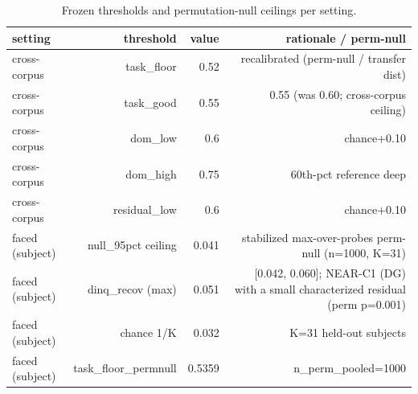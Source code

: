 \begin{table}[t]
\centering
\caption{Frozen thresholds and permutation-null ceilings per setting.}
\label{tab:thresh}
\begin{tabular}{lrrr}
\toprule
setting & threshold & value & rationale / perm-null \\
\midrule
cross-corpus & task\_floor & 0.52 & recalibrated (perm-null / transfer dist) \\
cross-corpus & task\_good & 0.55 & 0.55 (was 0.60; cross-corpus ceiling) \\
cross-corpus & dom\_low & 0.6 & chance+0.10 \\
cross-corpus & dom\_high & 0.75 & 60th-pct reference deep \\
cross-corpus & residual\_low & 0.6 & chance+0.10 \\
faced (subject) & null\_95pct ceiling & 0.041 & stabilized max-over-probes perm-null (n=1000, K=31) \\
faced (subject) & dinq\_recov (max) & 0.051 & [0.042, 0.060]; NEAR-C1 (DG) with a small characterized residual (perm p=0.001) \\
faced (subject) & chance 1/K & 0.032 & K=31 held-out subjects \\
faced (subject) & task\_floor\_permnull & 0.5359 & n\_perm\_pooled=1000 \\
\bottomrule
\end{tabular}
\end{table}